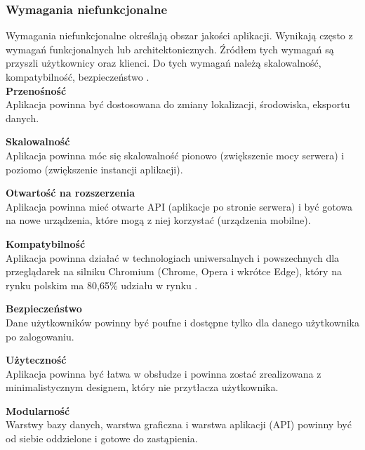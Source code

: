 \documentclass[12pt]{article}
\numberwithin{figure}{section}
\begin{document}
\begin{sloppypar}
\subsubsection{Wymagania niefunkcjonalne}

Wymagania niefunkcjonalne określają obszar jakości aplikacji. Wynikają często z wymagań funkcjonalnych lub architektonicznych. Źródłem tych wymagań są przyszli użytkownicy oraz klienci. Do tych wymagań należą skalowalność, kompatybilność, bezpieczeństwo \cite{niefunkcjonalne}.\\
\noindent
\textbf{Przenośność}\\
\indent
Aplikacja powinna być dostosowana do zmiany lokalizacji, środowiska, eksportu danych.

\noindent
\textbf{Skalowalność}\\
\indent
Aplikacja powinna móc się skalowalność pionowo (zwiększenie mocy serwera) i poziomo (zwiększenie instancji aplikacji).

\noindent
\textbf{Otwartość na rozszerzenia}\\
\indent
Aplikacja powinna mieć otwarte API (aplikacje po stronie serwera) i być gotowa na nowe urządzenia, które mogą z niej korzystać (urządzenia mobilne).

\noindent
\textbf{Kompatybilność}\\
\indent
Aplikacja powinna działać w technologiach uniwersalnych i powszechnych dla przeglądarek na silniku Chromium (Chrome, Opera i wkrótce Edge), który na rynku polskim ma 80,65\% udziału w rynku \cite{chrome}.

\noindent
\textbf{Bezpieczeństwo}\\
\indent
Dane użytkowników powinny być poufne i dostępne tylko dla danego użytkownika po zalogowaniu.

\noindent
\textbf{Użyteczność }\\
\indent
Aplikacja powinna być łatwa w obsłudze i powinna zostać zrealizowana z minimalistycznym designem, który nie przytłacza użytkownika.

\noindent
\textbf{Modularność}\\
\indent
Warstwy bazy danych, warstwa graficzna i warstwa  aplikacji (API) powinny być od siebie oddzielone i gotowe do zastąpienia.
    

\end{sloppypar}
\end{document}
